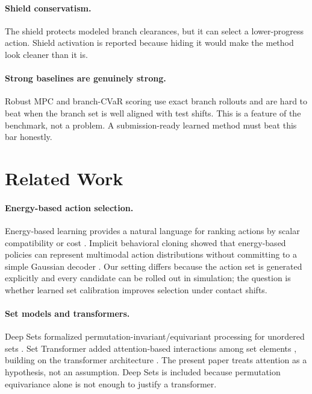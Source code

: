 \documentclass{article}
\begin{document}
\paragraph{Shield conservatism.}
The shield protects modeled branch clearances, but it can select a lower-progress action.  Shield activation is reported because hiding it would make the method look cleaner than it is.

\paragraph{Strong baselines are genuinely strong.}
Robust MPC and branch-CVaR scoring use exact branch rollouts and are hard to beat when the branch set is well aligned with test shifts.  This is a feature of the benchmark, not a problem.  A submission-ready learned method must beat this bar honestly.

\section{Related Work}

\paragraph{Energy-based action selection.}
Energy-based learning provides a natural language for ranking actions by scalar compatibility or cost \citep{lecun2006tutorial}.  Implicit behavioral cloning showed that energy-based policies can represent multimodal action distributions without committing to a simple Gaussian decoder \citep{florence2022implicit}.  Our setting differs because the action set is generated explicitly and every candidate can be rolled out in simulation; the question is whether learned set calibration improves selection under contact shifts.

\paragraph{Set models and transformers.}
Deep Sets formalized permutation-invariant/equivariant processing for unordered sets \citep{zaheer2017deep}.  Set Transformer added attention-based interactions among set elements \citep{lee2019set}, building on the transformer architecture \citep{vaswani2017attention}.  The present paper treats attention as a hypothesis, not an assumption.  Deep Sets is included because permutation equivariance alone is not enough to justify a transformer.
\end{document}
